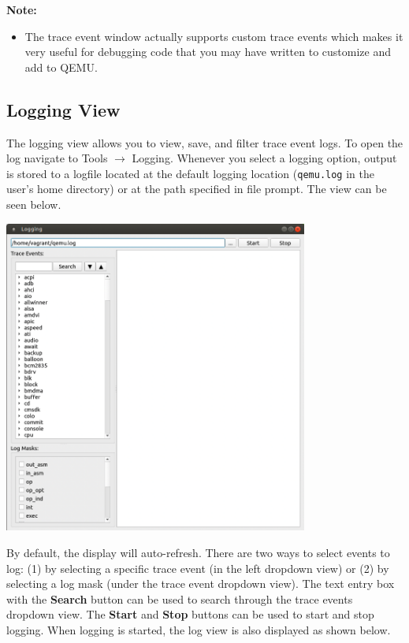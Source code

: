 \documentclass{article}
\newcommand{\code}[1]{\texttt{#1}}
\begin{document}
\textbf{Note:}
\begin{itemize}
    \item The trace event window actually supports custom trace events which makes it very useful for debugging code that you may have written to customize and add to QEMU.
\end{itemize}

\subsection{Logging View}
The logging view allows you to view, save, and filter trace event logs. To open the log navigate to Tools $\rightarrow$ Logging. Whenever you select a logging option, output is stored to a logfile located at the default logging location (\code{qemu.log} in the user's home directory) or at the path specified in file prompt. The view can be seen below.
\begin{center}
    \includegraphics[width=100mm]{images/logging-view.png}
\end{center}
By default, the display will auto-refresh. There are two ways to select events to log: (1) by selecting a specific trace event (in the left dropdown view) or (2) by selecting a log mask (under the trace event dropdown view). The text entry box with the \textbf{Search} button can be used to search through the trace events dropdown view. The \textbf{Start} and \textbf{Stop} buttons can be used to start and stop logging. When logging is started, the log view is also displayed as shown below.
\end{document}
